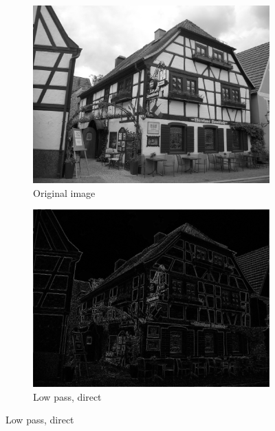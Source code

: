 \documentclass[12pt]{amsart}
\theoremstyle{definition}
\theoremstyle{remark}
\numberwithin{thm}{section}
\begin{document}
\begin{figure}[h] \centering 
\begin{subfigure}[b]{0.4\textwidth} \includegraphics[width=\textwidth]{house_original.png} \caption{Original image} %
\end{subfigure}
\begin{subfigure}[b]{0.4\textwidth} \includegraphics[width=\textwidth]{house_direct.png} \caption{Low pass, direct}\end{subfigure}


\end{figure}
\end{document}
